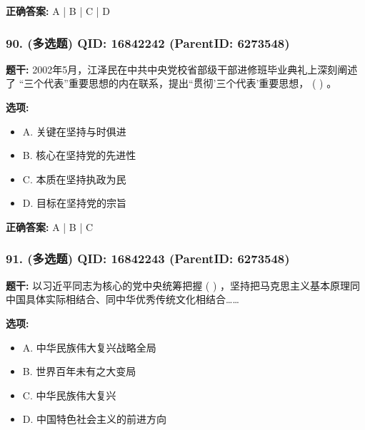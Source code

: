 \documentclass[12pt,UTF8]{ctexart}
\begin{document}
\textbf{正确答案:}
A | B | C | D

\vspace{0.3em}\hrulefill\vspace{0.7em}

\subsubsection*{90. (多选题) \small QID: 16842242 (ParentID: 6273548)}

\textbf{题干:}
2002年5月，江泽民在中共中央党校省部级干部进修班毕业典礼上深刻阐述了 “三个代表”重要思想的内在联系，提出“贯彻’三个代表’重要思想， ( ) 。



\textbf{选项:}
\begin{itemize}[leftmargin=*]

  \item A. 关键在坚持与时俱进

  \item B. 核心在坚持党的先进性

  \item C. 本质在坚持执政为民

  \item D. 目标在坚持党的宗旨

\end{itemize}

\textbf{正确答案:}
A | B | C

\vspace{0.3em}\hrulefill\vspace{0.7em}

\subsubsection*{91. (多选题) \small QID: 16842243 (ParentID: 6273548)}

\textbf{题干:}
以习近平同志为核心的党中央统筹把握 ( ) ，坚持把马克思主义基本原理同中国具体实际相结合、同中华优秀传统文化相结合……



\textbf{选项:}
\begin{itemize}[leftmargin=*]

  \item A. 中华民族伟大复兴战略全局

  \item B. 世界百年未有之大变局

  \item C. 中华民族伟大复兴

  \item D. 中国特色社会主义的前进方向

\end{itemize}
\end{document}
